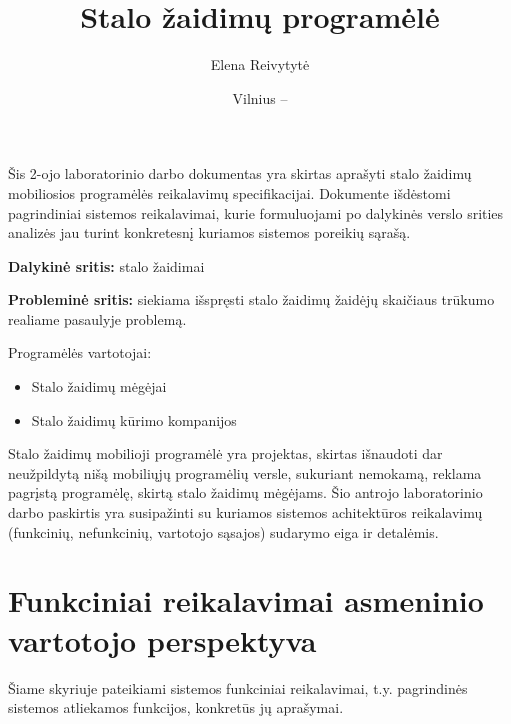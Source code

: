 \documentclass{VUMIFPSkursinis}
\title{Stalo žaidimų programėlė}
\author{Elena Reivytytė}
\date{Vilnius – \the\year}
\begin{document}
\maketitle

Šis 2-ojo laboratorinio darbo dokumentas yra skirtas aprašyti stalo žaidimų mobiliosios programėlės reikalavimų specifikacijai. Dokumente išdėstomi pagrindiniai sistemos reikalavimai, kurie formuluojami po dalykinės verslo srities analizės jau turint konkretesnį kuriamos sistemos poreikių sąrašą.

\tableofcontents

\textbf{Dalykinė sritis:} stalo žaidimai

\textbf{Probleminė sritis:} siekiama išspręsti stalo žaidimų žaidėjų skaičiaus trūkumo realiame pasaulyje problemą.

Programėlės vartotojai: 
\begin{itemize}
	\item Stalo žaidimų mėgėjai
	\item Stalo žaidimų kūrimo kompanijos
\end{itemize}

Stalo žaidimų mobilioji programėlė yra projektas, skirtas išnaudoti dar neužpildytą nišą mobiliųjų programėlių versle, sukuriant nemokamą, reklama pagrįstą programėlę, skirtą stalo žaidimų mėgėjams. 
Šio antrojo laboratorinio darbo paskirtis yra susipažinti su kuriamos sistemos achitektūros reikalavimų (funkcinių, nefunkcinių, vartotojo sąsajos) sudarymo eiga ir detalėmis.

\section{Funkciniai reikalavimai asmeninio vartotojo perspektyva}
Šiame skyriuje pateikiami sistemos funkciniai reikalavimai, t.y. pagrindinės sistemos atliekamos funkcijos, konkretūs jų aprašymai.

\newcommand\rownumberfr{\stepcounter{frcount}\arabic{frcount}}
\end{document}
